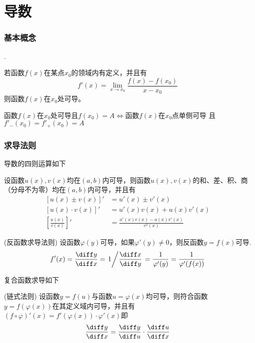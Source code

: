 \part{导数}
\section{基本概念}
.
\begin{definition}
    若函数$f(x)$在某点$x_0$的领域内有定义，并且有
    \[ f'(x) = \lim_{x \to x_0} \frac{f(x)-f(x_0)}{x-x_0} \]
    则函数$f(x)$在$x_0$处可导。
\end{definition}

\begin{theorem}
    函数$f(x)$在$x_0$处可导且$f(x_0) = A \iff$函数$f(x)$在$x_0$点单侧可导
    且$f'_-(x_0)=f'_+(x_0)=A$
\end{theorem}


\section{求导法则}
导数的四则运算如下
\begin{theorem}
    设函数$u(x), v(x)$均在$(a,b)$内可导，则函数$u(x), v(x)$的和、差、积、商（分母不为零）均在$(a,b)$内可导，并且有
    \begin{align}
        \left[u(x) \pm v(x) \right]'      & = u'(x) \pm v'(x)                      \\
        \left[ u(x) \cdot v(x) \right]'   & = u'(x)v(x) + u(x)v'(x)                \\
        \left[ \frac{u(x)}{v(x)} \right]' & = \frac{u'(x)v(x) - u(x)v'(x)}{v^2(x)}
    \end{align}
\end{theorem}

\begin{theorem}
    (反函数求导法则)
    \label{th:反函数求导法则}
    设函数$\varphi (y)$可导，如果$\varphi'(y) \neq 0$，则反函数$y=f(x)$可导.
    \[ f'(x) = \frac{\diff y}{\diff x} = \left. 1 \middle / \frac{\diff x}{\diff y}\right. = \frac{1}{\varphi'(y)} = \frac{1}{\varphi'(f(x))} \]
\end{theorem}
复合函数求导如下
\begin{theorem}
    (链式法则)
    \label{th:链式法则}
    设函数$y=f(u)$与函数$u=\varphi(x)$均可导，则符合函数$y=f(\varphi(x))$在其定义域内可导，并且有$(f\circ\varphi)'(x)=f'(\varphi(x))\cdot\varphi'(x)$即
    \[ \frac{\diff y}{\diff x} = \frac{\diff y}{\diff u} \cdot \frac{\diff u}{\diff x} \]
\end{theorem}

